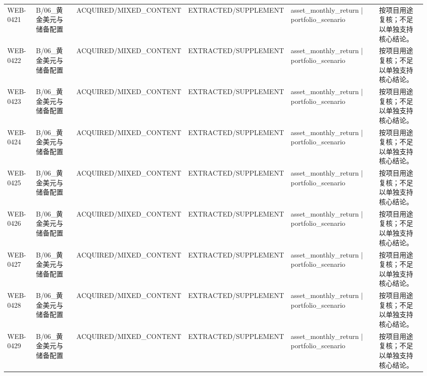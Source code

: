 \begin{landscape}
\begin{longtable}{p{1.8cm}p{2.6cm}p{2.6cm}p{2.6cm}p{4.8cm}p{7.2cm}}
WEB-0421 & B/\allowbreak{}06\_\allowbreak{}黄金美元与储备配置 & ACQUIRED/\allowbreak{}MIXED\_\allowbreak{}CONTENT & EXTRACTED/\allowbreak{}SUPPLEMENT & asset\_\allowbreak{}monthly\_\allowbreak{}return | portfolio\_\allowbreak{}scenario & 按项目用途复核；不足以单独支持核心结论。\\
WEB-0422 & B/\allowbreak{}06\_\allowbreak{}黄金美元与储备配置 & ACQUIRED/\allowbreak{}MIXED\_\allowbreak{}CONTENT & EXTRACTED/\allowbreak{}SUPPLEMENT & asset\_\allowbreak{}monthly\_\allowbreak{}return | portfolio\_\allowbreak{}scenario & 按项目用途复核；不足以单独支持核心结论。\\
WEB-0423 & B/\allowbreak{}06\_\allowbreak{}黄金美元与储备配置 & ACQUIRED/\allowbreak{}MIXED\_\allowbreak{}CONTENT & EXTRACTED/\allowbreak{}SUPPLEMENT & asset\_\allowbreak{}monthly\_\allowbreak{}return | portfolio\_\allowbreak{}scenario & 按项目用途复核；不足以单独支持核心结论。\\
WEB-0424 & B/\allowbreak{}06\_\allowbreak{}黄金美元与储备配置 & ACQUIRED/\allowbreak{}MIXED\_\allowbreak{}CONTENT & EXTRACTED/\allowbreak{}SUPPLEMENT & asset\_\allowbreak{}monthly\_\allowbreak{}return | portfolio\_\allowbreak{}scenario & 按项目用途复核；不足以单独支持核心结论。\\
WEB-0425 & B/\allowbreak{}06\_\allowbreak{}黄金美元与储备配置 & ACQUIRED/\allowbreak{}MIXED\_\allowbreak{}CONTENT & EXTRACTED/\allowbreak{}SUPPLEMENT & asset\_\allowbreak{}monthly\_\allowbreak{}return | portfolio\_\allowbreak{}scenario & 按项目用途复核；不足以单独支持核心结论。\\
WEB-0426 & B/\allowbreak{}06\_\allowbreak{}黄金美元与储备配置 & ACQUIRED/\allowbreak{}MIXED\_\allowbreak{}CONTENT & EXTRACTED/\allowbreak{}SUPPLEMENT & asset\_\allowbreak{}monthly\_\allowbreak{}return | portfolio\_\allowbreak{}scenario & 按项目用途复核；不足以单独支持核心结论。\\
WEB-0427 & B/\allowbreak{}06\_\allowbreak{}黄金美元与储备配置 & ACQUIRED/\allowbreak{}MIXED\_\allowbreak{}CONTENT & EXTRACTED/\allowbreak{}SUPPLEMENT & asset\_\allowbreak{}monthly\_\allowbreak{}return | portfolio\_\allowbreak{}scenario & 按项目用途复核；不足以单独支持核心结论。\\
WEB-0428 & B/\allowbreak{}06\_\allowbreak{}黄金美元与储备配置 & ACQUIRED/\allowbreak{}MIXED\_\allowbreak{}CONTENT & EXTRACTED/\allowbreak{}SUPPLEMENT & asset\_\allowbreak{}monthly\_\allowbreak{}return | portfolio\_\allowbreak{}scenario & 按项目用途复核；不足以单独支持核心结论。\\
WEB-0429 & B/\allowbreak{}06\_\allowbreak{}黄金美元与储备配置 & ACQUIRED/\allowbreak{}MIXED\_\allowbreak{}CONTENT & EXTRACTED/\allowbreak{}SUPPLEMENT & asset\_\allowbreak{}monthly\_\allowbreak{}return | portfolio\_\allowbreak{}scenario & 按项目用途复核；不足以单独支持核心结论。\\

\end{longtable}
\end{landscape}
